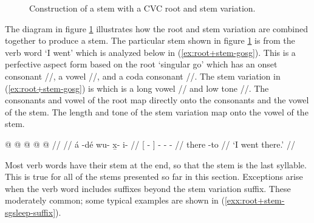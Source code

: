 \begin{figure}
\centerfloat
{}
\caption{Construction of a stem with a CVC root and  stem variation.}
\label{fig:root+stem-example-stem-docking}
\end{figure}

The diagram in figure \ref{fig:root+stem-example-stem-docking} illustrates how the root and stem variation are combined together to produce a stem. The particular stem shown in figure \ref{fig:root+stem-example-stem-docking} is from the verb word  ‘I went’ which is analyzed below in (\ref{ex:root+stem-gosg}). This is a perfective aspect form based on the root  ‘singular go’ which has an onset consonant //, a vowel //, and a coda consonant //. The stem variation in (\ref{ex:root+stem-gosg}) is  which is a long vowel // and low tone //. The consonants and vowel of the root map directly onto the consonants and the vowel of the stem. The length and tone of the stem variation map onto the vowel of the stem.

\ex\label{ex:root+stem-gosg}%
%
\begingl
	\gla	{}  @ {} {}  @ {} @ {} @ {} @ {} //
	\glp	{} \llap{[} {} {} \rlap{\ipa{χʷàː.ˈ\gm{kʷùːt}}]} {} {} {} {} //
	\glb	{} á -dé {} wu- x̱- i-   //
	\glc	{}[  - {}] - - -   //
	\gld	{} there -to {}  {} {} {} {} //
	\glft	‘I went there.’
		//
\endgl
\xe

Most verb words have their stem at the end, so that the stem is the last syllable. This is true for all of the stems presented so far in this section. Exceptions arise when the verb word includes suffixes beyond the stem variation suffix. These moderately common; some typical examples are shown in (\ref{exx:root+stem-sgsleep-suffix}).

